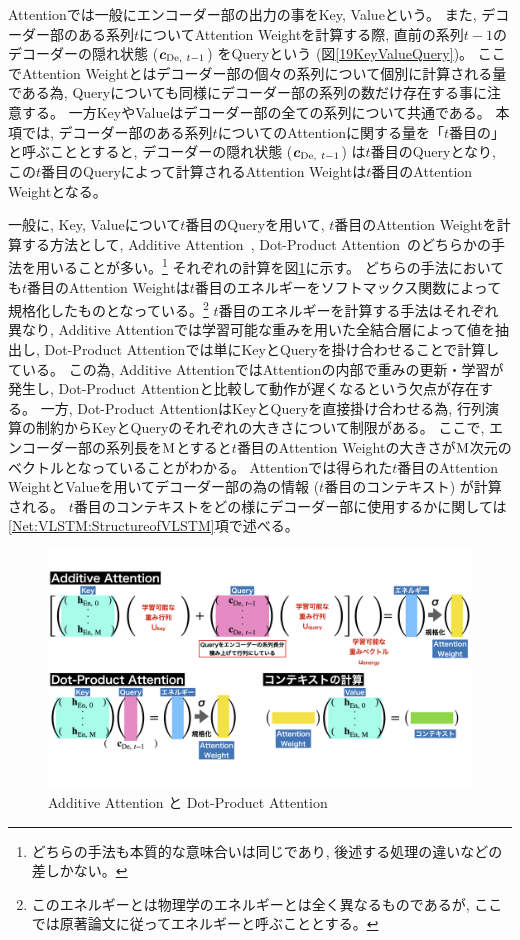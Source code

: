 Attentionでは一般にエンコーダー部の出力の事をKey, Valueという。
また, デコーダー部のある系列$t$についてAttention Weightを計算する際, 直前の系列$t-1$のデコーダーの隠れ状態 (${\mbox{\boldmath{$c$}}}_{{\rm De},\ t-1}$) をQueryという (図\ref{19KeyValueQuery})。
ここでAttention Weightとはデコーダー部の個々の系列について個別に計算される量である為, Queryについても同様にデコーダー部の系列の数だけ存在する事に注意する。
一方KeyやValueはデコーダー部の全ての系列について共通である。
本項では, デコーダー部のある系列$t$についてのAttentionに関する量を「$t$番目の」と呼ぶこととすると, デコーダーの隠れ状態 (${\mbox{\boldmath{$c$}}}_{{\rm De},\ t-1}$) は$t$番目のQueryとなり, この$t$番目のQueryによって計算されるAttention Weightは$t$番目のAttention Weightとなる。

一般に, Key, Valueについて$t$番目のQueryを用いて, $t$番目のAttention Weightを計算する方法として, Additive Attention~\cite{BahdanauAttention}, Dot-Product Attention~\cite{LuongAttention}のどちらかの手法を用いることが多い。\footnote{どちらの手法も本質的な意味合いは同じであり, 後述する処理の違いなどの差しかない。}
それぞれの計算を図\ref{20Attention}に示す。
どちらの手法においても$t$番目のAttention Weightは$t$番目のエネルギーをソフトマックス関数によって規格化したものとなっている。\footnote{このエネルギーとは物理学のエネルギーとは全く異なるものであるが, ここでは原著論文に従ってエネルギーと呼ぶこととする。}
$t$番目のエネルギーを計算する手法はそれぞれ異なり, Additive Attentionでは学習可能な重みを用いた全結合層によって値を抽出し, Dot-Product Attentionでは単にKeyとQueryを掛け合わせることで計算している。
この為, Additive AttentionではAttentionの内部で重みの更新・学習が発生し, Dot-Product Attentionと比較して動作が遅くなるという欠点が存在する。
一方, Dot-Product AttentionはKeyとQueryを直接掛け合わせる為, 行列演算の制約からKeyとQueryのそれぞれの大きさについて制限がある。
ここで, エンコーダー部の系列長を$\rm M$とすると$t$番目のAttention Weightの大きさが$\rm M$次元のベクトルとなっていることがわかる。
Attentionでは得られた$t$番目のAttention WeightとValueを用いてデコーダー部の為の情報 ($t$番目のコンテキスト) が計算される。
$t$番目のコンテキストをどの様にデコーダー部に使用するかに関しては\ref{Net:VLSTM:StructureofVLSTM}項で述べる。\\

\begin{figure}[htbp]
 \centering
 \includegraphics[trim = 0 100 0 100, width=1.0\textwidth, clip]{Figure/2DeepLearning/20Attention.png}
 \caption{Additive Attention と Dot-Product Attention}
 \label{20Attention}
\end{figure}

